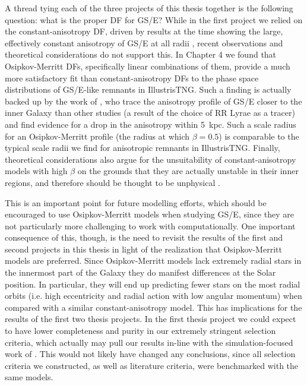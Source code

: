 A thread tying each of the three projects of this thesis together is the following question: what is the proper DF for GS/E? While in the first project we relied on the constant-anisotropy DF, driven by results at the time showing the large, effectively constant anisotropy of GS/E at all radii \parencite[e.g.][]{belokurov18,lancaster19}, recent observations and theoretical considerations do not support this. In Chapter 4 we found that Osipkov-Merritt DFs, specifically linear combinations of them, provide a much more satisfactory fit than constant-anisotropy DFs to the phase space distributions of GS/E-like remnants in IllustrisTNG. Such a finding is actually backed up by the work of \textcite{iorio21}, who trace the anisotropy profile of GS/E closer to the inner Galaxy than other studies (a result of the choice of RR Lyrae as a tracer) and find evidence for a drop in the anisotropy within 5~kpc. Such a scale radius for an Osipkov-Merritt profile (the radius at which $\beta=0.5$) is comparable to the typical scale radii we find for anisotropic remnants in IllustrisTNG. Finally, theoretical considerations also argue for the unsuitability of constant-anisotropy models with high $\beta$ on the grounds that they are actually unstable in their inner regions, and therefore should be thought to be unphysical \parencite[see][and references therein]{binney14d}.

This is an important point for future modelling efforts, which should be encouraged to use Osipkov-Merritt models when studying GS/E, since they are not particularly more challenging to work with computationally. One important consequence of this, though, is the need to revisit the results of the first and second projects in this thesis in light of the realization that Osipkov-Merritt models are preferred. Since Osipkov-Merritt models lack extremely radial stars in the innermost part of the Galaxy they do manifest differences at the Solar position. In particular, they will end up predicting fewer stars on the most radial orbits (i.e. high eccentricity and radial action with low angular momentum) when compared with a similar constant-anisotropy model. This has implications for the results of the first two thesis projects. In the first thesis project we could expect to have lower completeness and purity in our extremely stringent selection criteria, which actually may pull our results in-line with the simulation-focused work of \textcite{carrillo23}. This would not likely have changed any conclusions, since all selection criteria we constructed, as well as literature criteria, were benchmarked with the same models.

